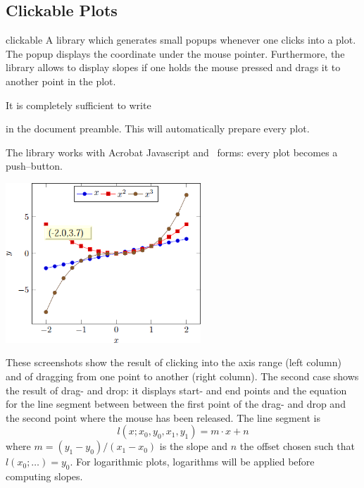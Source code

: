 \subsection{Clickable Plots}
\begin{pgfplotslibrary}{clickable}
	A library which generates small popups whenever one clicks into a plot. The popup displays the coordinate under the mouse pointer. Furthermore, the library allows to display slopes if one holds the mouse pressed and drags it to another point in the plot.


	It is completely sufficient to write 
\begin{codeexample}
\end{codeexample}
	\noindent in the document preamble. This will automatically prepare every plot.

	The library works with Acrobat Javascript and \pdf\ forms: every plot becomes a push--button. 

	\includegraphics[height=6cm]{figures/pgfplotsclickable-fig1.png}
	\hfill

	\nobreak
	These screenshots show the result of clicking into the axis range (left column) and of dragging from one point to another (right column). The second case shows the result of drag- and drop: it displays start- and end points and the equation for the line segment between between the first point of the drag- and drop and the second point where the mouse has been released. The line segment is 
	\[ l(x; x_0,y_0,x_1,y_1) = m \cdot x + n \]
	where $m = (y_1-y_0) / (x_1-x_0)$ is the slope and $n$ the offset chosen such that $l(x_0;\dotsc) = y_0$. For logarithmic plots, logarithms will be applied before computing slopes. 


\end{pgfplotslibrary}
